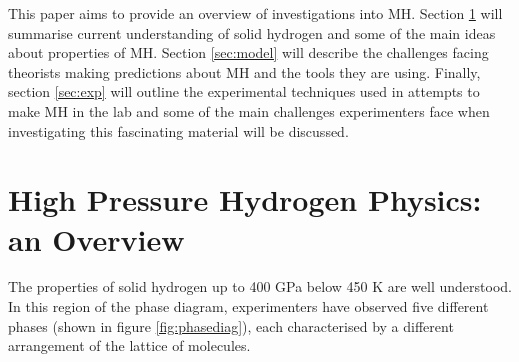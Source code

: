 \documentclass[esp]{FCEFyN-class}
\begin{document}
This paper aims to provide an overview of investigations into MH. Section \ref{sec:overview} will summarise current understanding of solid hydrogen and some of the main ideas about properties of MH. Section \ref{sec:model} will describe the challenges facing theorists making predictions about MH and the tools they are using. Finally, section \ref{sec:exp} will outline the experimental techniques used in attempts to make MH in the lab and some of the main challenges experimenters face when investigating this fascinating material will be discussed.


\vspace{7mm} %

\section{High Pressure Hydrogen Physics: an Overview}
\label{sec:overview}
\vspace{2mm} %

The properties of solid hydrogen up to 400 GPa below 450 K are well understood. In this region of the phase diagram, experimenters have observed five different phases (shown in figure \ref{fig:phasediag}), each characterised by a different arrangement of the lattice of  molecules.
\end{document}
